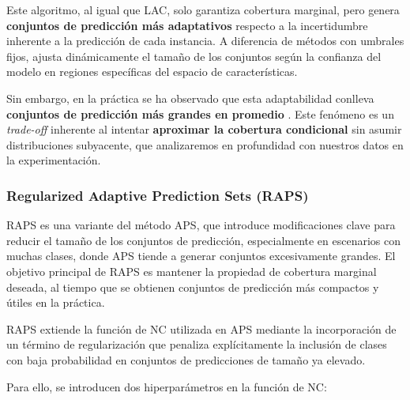 Este algoritmo, al igual que \acrshort{LAC}, solo garantiza cobertura marginal, pero genera \textbf{conjuntos de predicción más adaptativos} respecto a la incertidumbre inherente a la predicción de cada instancia. A diferencia de métodos con umbrales fijos, ajusta dinámicamente el tamaño de los conjuntos según la confianza del modelo en regiones específicas del espacio de características.

Sin embargo, en la práctica se ha observado que esta adaptabilidad conlleva \textbf{conjuntos de predicción más grandes en promedio} \cite{romano2020, angelopoulos2020}. Este fenómeno es un \textit{trade-off} inherente al intentar \textbf{aproximar la cobertura condicional} sin asumir distribuciones subyacente, que analizaremos en profundidad con nuestros datos en la experimentación.


\subsubsection{Regularized Adaptive Prediction Sets (RAPS)}

\acrshort{RAPS} \cite{angelopoulos2020} es una variante del método APS, que introduce modificaciones clave para reducir el tamaño de los conjuntos de predicción, especialmente en escenarios con muchas clases, donde \acrshort{APS} tiende a generar conjuntos excesivamente grandes. El objetivo principal de \acrshort{RAPS} es mantener la propiedad de cobertura marginal deseada, al tiempo que se obtienen conjuntos de predicción más compactos y útiles en la práctica. 

\acrshort{RAPS} extiende la función de \acrshort{NC} utilizada en \acrshort{APS} mediante la incorporación de un término de regularización que penaliza explícitamente la inclusión de clases con baja probabilidad en conjuntos de predicciones de tamaño ya elevado. 

Para ello, se introducen dos hiperparámetros en la función de \acrshort{NC}:

